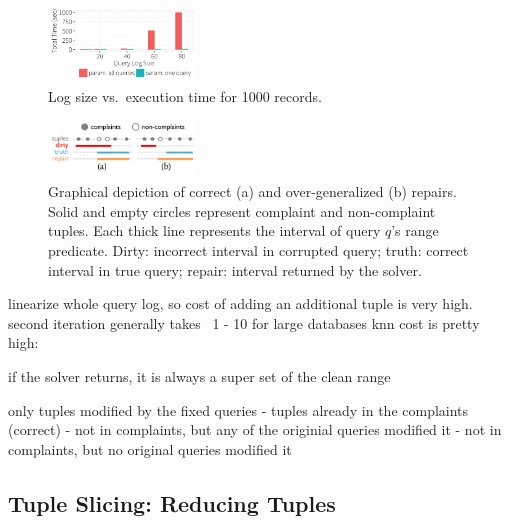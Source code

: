 \begin{figure}[t]
    \centering
    \includegraphics[width=0.35\textwidth]{figures/qsize_time_badscale}
    \vspace*{-0.1in}
    \caption{Log size vs.\ execution time for 1000 records. }
    \label{fig:querysize_vs_time}
\end{figure}

\begin{figure}[t]
    \centering
    \includegraphics[width=0.35\textwidth]{figures/2nditerationgroups}
    \vspace*{-2mm}
    \caption{
      Graphical depiction of correct (a) and over-generalized (b) repairs.
      Solid and empty circles represent complaint and non-complaint tuples.
      Each thick line represents the interval of query $q$'s range predicate.
      Dirty: incorrect interval in corrupted query;
      truth: correct interval in true query;
      repair: interval returned by the solver.}
    \label{fig:groups}
\end{figure}



linearize whole query log, so cost of adding an additional tuple is very high.
second iteration generally takes ~1 - 10
for large databases knn cost is pretty high: ~

if the solver returns, it is always a super set of the clean range

only tuples modified by the fixed queries
- tuples already in the complaints (correct)
- not in complaints, but any of the originial queries modified it
- not in complaints, but no original queries modified it
\fi



\subsection{Tuple Slicing: Reducing Tuples}
\label{sec:opt:tbsize}


